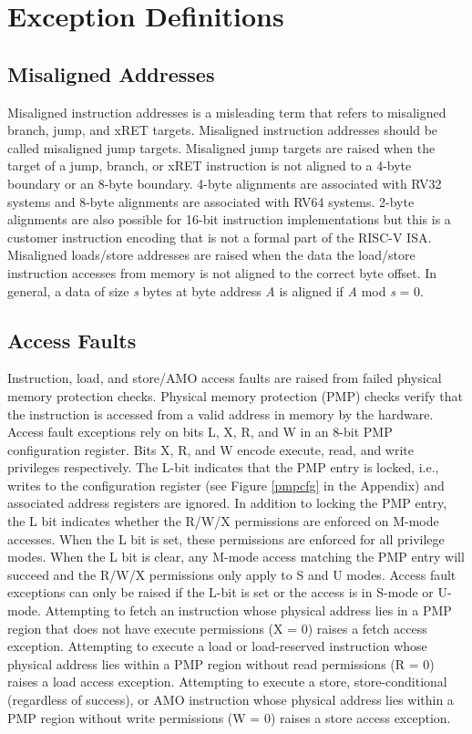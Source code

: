 \documentclass[12pt]{article}
\begin{document}
\section{Exception Definitions}
\subsection{Misaligned Addresses}
Misaligned instruction addresses is a misleading term that refers to misaligned branch, jump, and xRET targets. Misaligned instruction addresses should be called misaligned jump targets. Misaligned jump targets are raised when the target of a jump, branch, or xRET instruction is not aligned to a 4-byte boundary or an 8-byte boundary. 4-byte alignments are associated with RV32 systems and 8-byte alignments are associated with RV64 systems. 2-byte alignments are also possible for 16-bit instruction implementations but this is a customer instruction encoding that is not a formal part of the RISC-V ISA. Misaligned loads/store addresses are raised when the data the load/store instruction accesses from memory is not aligned to the correct byte offset. In general, a data of size \emph{s} bytes at byte address \emph{A} is aligned if \emph{A} mod \emph{s} = 0.

\subsection{Access Faults}
Instruction, load, and store/AMO access faults are raised from failed physical memory protection checks. Physical memory protection (PMP) checks verify that the instruction is accessed from a valid address in memory by the hardware. Access fault exceptions rely on bits L, X, R, and W in an 8-bit PMP configuration register. Bits X, R, and W encode execute, read, and write privileges respectively. The L-bit indicates that the PMP entry is locked, i.e., writes to the configuration register (see Figure \ref{pmpcfg} in the Appendix) and associated address registers are ignored. In addition to locking the PMP entry, the L bit indicates whether the R/W/X permissions are enforced on M-mode accesses. When the L bit is set, these permissions are enforced for all privilege modes. When the L bit is clear, any M-mode access matching the PMP entry will succeed and the R/W/X permissions only apply to S and U modes. Access fault exceptions can only be raised if the L-bit is set or the access is in S-mode or U-mode. Attempting to fetch an instruction whose physical address lies in a PMP region that does not have execute permissions (X = 0) raises a fetch access exception. Attempting to execute a load or load-reserved instruction whose physical address lies within a PMP region without read permissions (R = 0) raises a load access exception. Attempting to execute a store, store-conditional (regardless of success), or AMO instruction whose physical address lies within a PMP region without write permissions (W = 0) raises a store access exception.
\end{document}
